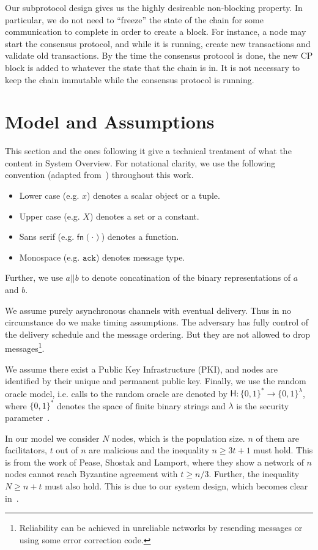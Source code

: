 Our subprotocol design gives us the highly desireable non-blocking property.
In particular, we do not need to ``freeze'' the state of the chain for some communication to complete in order to create a block.
For instance, a node may start the consensus protocol, and while it is running, create new transactions and validate old transactions.
By the time the consensus protocol is done, the new CP block is added to whatever the state that the chain is in.
It is not necessary to keep the chain immutable while the consensus protocol is running.

\section{Model and Assumptions}
\label{sec:model-assumptions}

This section and the ones following it give a technical treatment of what the content in System Overview.
For notational clarity, we use the following convention (adapted from~\cite{miller2016honey}) throughout this work.
\begin{itemize}
\item Lower case (e.g. $x$) denotes a scalar object or a tuple.
\item Upper case (e.g. $X$) denotes a set or a constant.
\item Sans serif (e.g. $\textsf{fn}(\cdot)$) denotes a function.
\item Monospace (e.g. $\texttt{ack}$) denotes message type.
\end{itemize}
Further, we use $a || b$ to denote concatination of the binary representations of $a$ and $b$.

We assume purely asynchronous channels with eventual delivery.
Thus in no circumstance do we make timing assumptions.
The adversary has fully control of the delivery schedule and the message ordering.
But they are not allowed to drop messages\footnote{
    Reliability can be achieved in unreliable networks by resending messages or using some error correction code.
}.

We assume there exist a Public Key Infrastructure (PKI), and nodes are identified by their unique and permanent public key.
Finally, we use the random oracle model, i.e. calls to the random oracle are denoted by $\textsf{H}: \{0, 1\}^* \rightarrow \{0, 1\}^\lambda$,
where $\{0, 1\}^*$ denotes the space of finite binary strings and $\lambda$ is the security parameter~\cite{bellare1993random}.

In our model we consider $N$ nodes, which is the population size.
$n$ of them are facilitators, $t$ out of $n$ are malicious and the inequality
$n \ge 3t + 1$ must hold.
This is from the work of Pease, Shostak and Lamport, where they show a network of $n$ nodes cannot reach Byzantine agreement with $t \ge n/3$.
Further, the inequality $N \ge n + t$ must also hold.
This is due to our system design, which becomes clear in~.

